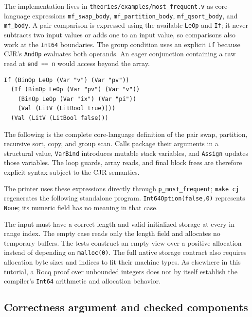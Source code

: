 The implementation lives in \texttt{theories/examples/most\_frequent.v}
as core-language expressions \texttt{mf\_swap\_body},
\texttt{mf\_partition\_body}, \texttt{mf\_qsort\_body}, and
\texttt{mf\_body}. A pair comparison is expressed using the available
\texttt{LeOp} and \texttt{If}; it never subtracts two input values or adds
one to an input value, so comparisons also work at the \texttt{Int64}
boundaries. The group condition uses an explicit \texttt{If} because CJR's
\texttt{AndOp} evaluates both operands. An eager conjunction containing a
raw read at \texttt{end == n} would access beyond the array.

\begin{lstlisting}
If (BinOp LeOp (Var "v") (Var "pv"))
  (If (BinOp LeOp (Var "pv") (Var "v"))
    (BinOp LeOp (Var "ix") (Var "pi"))
    (Val (LitV (LitBool true))))
  (Val (LitV (LitBool false)))
\end{lstlisting}
The following is the complete core-language definition of the pair swap,
partition, recursive sort, copy, and group scan. Calls package their
arguments in a structural value, \texttt{VarBind} introduces mutable stack
variables, and \texttt{Assign} updates those variables. The loop guards,
array reads, and final block frees are therefore explicit syntax subject
to the CJR semantics.


The printer uses these expressions directly through
\texttt{p\_most\_frequent}; \texttt{make cj} regenerates the following
standalone program. \texttt{Int64Option(false,0)} represents
\texttt{None}; its numeric field has no meaning in that case.


The input must have a correct length and valid initialized storage at
every in-range index. The empty case reads only the length field and
allocates no temporary buffers. The tests construct an empty view over a
positive allocation instead of depending on \texttt{malloc(0)}. The full
native storage contract also requires allocation byte sizes and indices
to fit their machine types. As elsewhere in this tutorial, a Rocq proof
over unbounded integers does not by itself establish the compiler's
\texttt{Int64} arithmetic and allocation behavior.

\subsection{Correctness argument and checked components}

